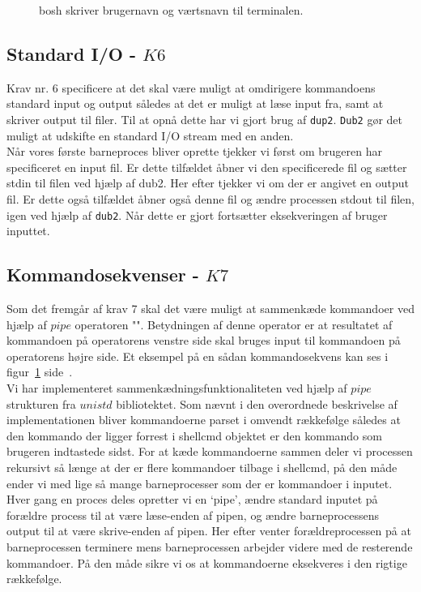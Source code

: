 \documentclass{article}
\begin{document}
\begin{figure}[H]
\center
{}
\caption{bosh skriver brugernavn og værtsnavn til terminalen.}
\label{fig:background}
\end{figure}

\subsection{Standard I/O - $K6$}
Krav nr. 6 specificere at det skal være muligt at omdirigere kommandoens standard input og output således at det er muligt at læse input fra, samt at skriver output til filer. Til at opnå dette har vi gjort brug af \texttt{dup2}. \texttt{Dub2} gør det muligt at udskifte en standard I/O stream med en anden.\\
Når vores første barneproces bliver oprette tjekker vi først om brugeren har specificeret en input fil. Er dette tilfældet åbner vi den specificerede fil og sætter stdin til filen ved hjælp af dub2. Her efter tjekker vi om der er angivet en output fil. Er dette også tilfældet åbner også denne fil og ændre processen stdout til filen, igen ved hjælp af \texttt{dub2}. Når dette er gjort fortsætter eksekveringen af bruger inputtet. 

\subsection{Kommandosekvenser - $K7$}
Som det fremgår af krav 7 skal det være muligt at sammenkæde kommandoer ved hjælp af $pipe$ operatoren "\textbar". Betydningen af denne operator er at resultatet af kommandoen på operatorens venstre side skal bruges input til kommandoen på operatorens højre side. Et eksempel på en sådan kommandosekvens kan ses i figur~\ref{fig:background} side~\pageref{fig:background}.\\

Vi har implementeret sammenkædningsfunktionaliteten ved hjælp af $pipe$ strukturen fra $unistd$ bibliotektet. Som nævnt i den overordnede beskrivelse af implementationen bliver kommandoerne parset i omvendt rækkefølge således at den kommando der ligger forrest i shellcmd objektet er den kommando som brugeren indtastede sidst. For at kæde kommandoerne sammen deler vi processen rekursivt så længe at der er flere kommandoer tilbage i shellcmd, på den måde ender vi med lige så mange barneprocesser som der er kommandoer i inputet. Hver gang en proces deles opretter vi en ‘pipe’, ændre standard inputet på forældre process til at være læse-enden af pipen, og ændre barneprocessens output til at være skrive-enden af pipen. Her efter venter forældreprocessen på at barneprocessen terminere mens barneprocessen arbejder videre med de resterende kommandoer. På den måde sikre vi os at kommandoerne eksekveres i den rigtige rækkefølge. 
\end{document}
